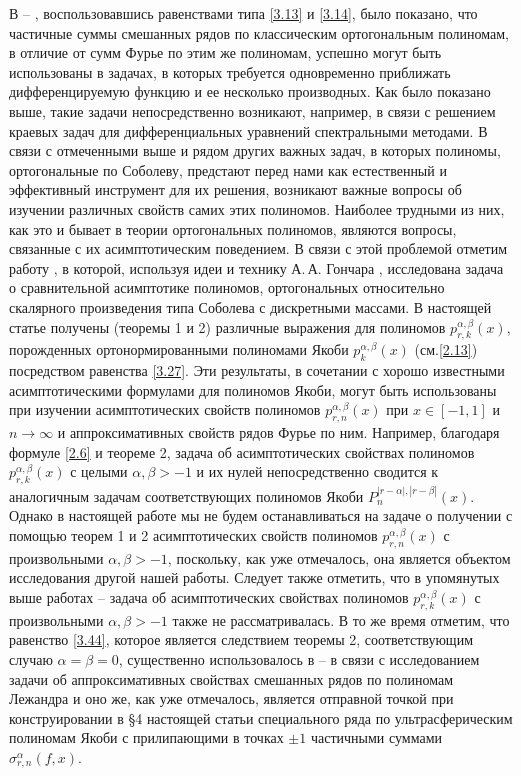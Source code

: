 В  \cite{Shar11} -- \cite{SHII}, воспользовавшись равенствами типа \eqref{3.13} и \eqref{3.14}, было показано, что частичные суммы смешанных рядов по классическим ортогональным полиномам, в отличие от сумм Фурье по этим же полиномам, успешно могут быть использованы в задачах, в которых требуется одновременно приближать дифференцируемую функцию и ее несколько производных. Как было показано выше, такие задачи непосредственно возникают, например, в связи с решением краевых задач для дифференциальных уравнений спектральными методами.
В связи с отмеченными выше и рядом других важных задач, в которых полиномы, ортогональные по Соболеву, предстают перед нами как естественный и эффективный инструмент для их решения, возникают важные вопросы об изучении различных  свойств самих этих полиномов. Наиболее трудными из них, как это и бывает в теории ортогональных полиномов, являются вопросы, связанные с их асимптотическим поведением.   В связи с этой проблемой  отметим  работу
\cite{Lopez1995}, в которой, используя  идеи и технику А.\,А. Гончара \cite{Gonchar1975}, исследована задача о сравнительной асимптотике полиномов, ортогональных относительно скалярного произведения типа  Соболева с дискретными массами.
В настоящей  статье получены (теоремы 1 и 2) различные выражения для полиномов $p_{r,k}^{\alpha,\beta}(x)$, порожденных ортонормированными полиномами Якоби $p_{k}^{\alpha,\beta}(x)$ (см.\eqref{2.13}) посредством  равенства \eqref{3.27}. Эти результаты, в сочетании с  хорошо известными асимптотическими формулами для полиномов Якоби, могут быть использованы  при изучении асимптотических свойств полиномов $p_{r,n}^{\alpha,\beta}(x)$ при $x\in[-1,1]$ и $n\to\infty$ и аппроксимативных свойств рядов Фурье по ним. Например,  благодаря формуле \eqref{2.6}  и теореме 2, задача об асимптотических свойствах полиномов $p_{r,k}^{\alpha,\beta}(x)$ с целыми $\alpha,\beta>-1$ и их нулей непосредственно сводится к аналогичным задачам соответствующих полиномов Якоби $P_n^{|r-\alpha|,|r-\beta|}(x)$.  Однако в настоящей работе мы не будем  останавливаться на задаче о получении с помощью теорем 1 и 2  асимптотических свойств полиномов $p_{r,n}^{\alpha,\beta}(x)$ с произвольными $\alpha,\beta>-1$, поскольку, как уже отмечалось, она является объектом исследования другой нашей работы. Следует также отметить, что в упомянутых выше работах \cite{Shar11} -- \cite{SHII} задача об асимптотических свойствах полиномов $p_{r,k}^{\alpha,\beta}(x)$ с произвольными $\alpha,\beta>-1$ также не рассматривалась. В то же время отметим, что
равенство \eqref{3.44}, которое является следствием теоремы 2, соответствующим случаю $\alpha=\beta=0$, существенно использовалось в \cite{Shar15} -- \cite{Shar17} в связи с исследованием задачи об аппроксимативных свойствах смешанных рядов по полиномам Лежандра и
оно же, как уже отмечалось,  является отправной точкой при конструировании в \S 4 настоящей статьи специального ряда  по ультрасферическим полиномам Якоби с  прилипающими в точках $\pm1$ частичными суммами $\sigma_{r,n}^\alpha(f,x)$.

